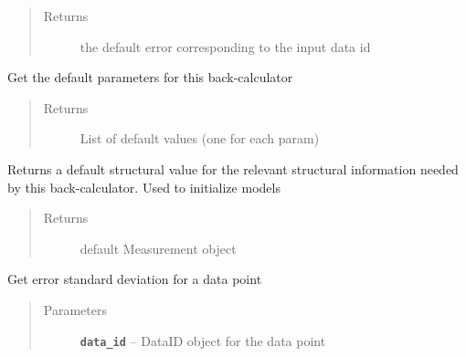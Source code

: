 \documentclass[letterpaper,10pt,english]{sphinxmanual}
\begin{document}
\begin{fulllineitems}
\begin{fulllineitems}
\begin{quote}
\begin{description}
\item[{Returns}] \leavevmode
the default error corresponding to the input data id

\end{description}\end{quote}

\end{fulllineitems}


\begin{fulllineitems}
\label{modules:backcalc.BaseBackCalculator.get_default_params}
Get the default parameters for this back-calculator
\begin{quote}\begin{description}
\item[{Returns}] \leavevmode
List of default values (one for each param)

\end{description}\end{quote}

\end{fulllineitems}


\begin{fulllineitems}
\label{modules:backcalc.BaseBackCalculator.get_default_struct_val}
Returns a default structural value for the relevant
structural information needed by this back-calculator.
Used to initialize models
\begin{quote}\begin{description}
\item[{Returns}] \leavevmode
default Measurement object

\end{description}\end{quote}

\end{fulllineitems}


\begin{fulllineitems}
\label{modules:backcalc.BaseBackCalculator.get_err_sig}
Get error standard deviation for a data point
\begin{quote}\begin{description}
\item[{Parameters}] \leavevmode
\textbf{\texttt{data\_id}} -- DataID object for the data point


\end{description}
\end{quote}
\end{fulllineitems}
\end{fulllineitems}
\end{document}
